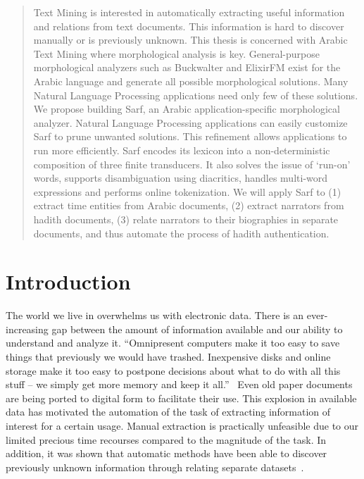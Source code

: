 \documentclass[a4,12pt]{report}
\begin{document}
\begin{abstract}
Text Mining 
is interested in automatically extracting useful information and relations from text documents.
This information is hard to discover manually or is previously unknown.
This thesis is concerned with Arabic Text Mining where
morphological analysis is key.%
General-purpose morphological analyzers such as Buckwalter and ElixirFM exist for the Arabic language and
generate all possible morphological solutions.
Many Natural Language Processing applications need only few of these solutions.
We propose building Sarf, an Arabic application-specific morphological analyzer. 
Natural Language Processing applications can easily customize Sarf 
to prune unwanted solutions. This refinement allows applications to run more efficiently. 
Sarf encodes its lexicon into a non-deterministic composition of three finite transducers.
It also solves the issue of `run-on' words, supports disambiguation using diacritics, 
handles multi-word expressions and performs online tokenization.
We will apply Sarf to  
(1) extract time entities from Arabic documents,
(2) extract narrators from hadith documents,
(3) relate narrators to their biographies in separate documents, and 
 thus automate the process of hadith authentication.

\end{abstract}

\chapter{Introduction}
\label{s:intro}

The world we live in overwhelms us with electronic data. There is an ever-increasing gap between the amount
of information available and our ability to understand and analyze it. ``Omnipresent computers make
it too easy to save things that previously we would have trashed. Inexpensive disks
and online storage make it too easy to postpone decisions about what to do with all
this stuff -- we simply get more memory and keep it all.''~\cite{Witten:11}
Even old paper documents are being ported to digital form to facilitate their use. 
This explosion in available data has motivated the automation of the task 
of extracting information of interest for a certain usage. 
Manual extraction is practically unfeasible due to
our limited precious time recourses compared to the magnitude of the task.
In addition, it was shown that automatic methods have been able to discover previously unknown 
information through relating separate datasets~\cite{JNi06}.
\end{document}
